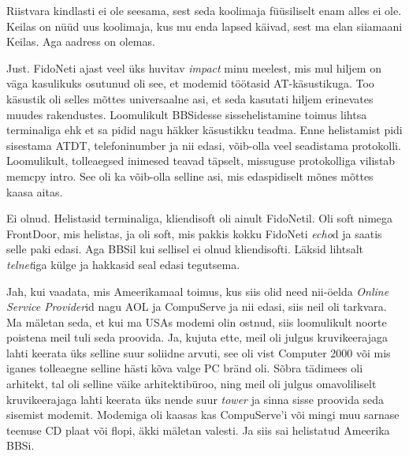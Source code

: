 
Riistvara kindlasti ei ole seesama, sest seda koolimaja füüsiliselt enam alles 
ei ole. Keilas on nüüd uus koolimaja, kus mu enda lapsed käivad, sest ma elan 
siiamaani Keilas. Aga aadress on olemas.


Just. FidoNeti ajast veel üks huvitav \emph{impact} minu meelest, mis mul  
hiljem on väga kasulikuks osutunud oli see, et modemid töötasid
AT-käsustikuga. 
Too käsustik oli selles mõttes universaalne asi, et seda kasutati hiljem 
erinevates muudes rakendustes. Loomulikult BBSidesse sissehelistamine toimus 
lihtsa terminaliga ehk et sa pidid nagu häkker käsustikku teadma. Enne 
helistamist pidi sisestama  ATDT, telefoninumber ja nii edasi, võib-olla veel 
seadistama protokolli. Loomulikult, tolleaegsed inimesed teavad täpselt, 
missuguse protokolliga vilistab  memcpy intro. See oli ka võib-olla selline 
asi, mis edaspidiselt  mõnes mõttes kaasa aitas.


Ei olnud. Helistasid terminaliga, kliendisoft oli ainult FidoNetil. Oli soft 
nimega FrontDoor, mis helistas, ja oli soft, mis pakkis kokku FidoNeti 
\emph{echo}d ja  saatis  selle paki edasi. Aga BBSil kui sellisel ei olnud 
kliendisofti. Läksid lihtsalt \emph{telnet}iga külge ja hakkasid seal edasi 
tegutsema.


Jah, kui vaadata, mis Ameerikamaal toimus, kus siis olid need nii-öelda 
\emph{Online Service Provider}id  nagu AOL ja 
CompuServe ja nii edasi, siis neil oli tarkvara. Ma mäletan seda, et 
kui ma USAs modemi  olin ostnud, siis loomulikult noorte poistena meil tuli 
seda proovida. Ja, kujuta ette, meil oli julgus kruvikeerajaga lahti keerata 
üks selline suur soliidne arvuti, see oli vist Computer 2000 või mis iganes 
tolleaegne  selline hästi kõva valge PC bränd oli. Sõbra tädimees oli 
arhitekt, tal oli selline väike arhitektibüroo, ning meil oli julgus  
omavoliliselt kruvikeerajaga  lahti keerata üks nende suur \emph{tower} ja 
sinna sisse proovida seda sisemist modemit. Modemiga oli kaasas kas 
CompuServe'i või mingi muu sarnase teenuse CD plaat või flopi, äkki mäletan 
valesti. Ja siis sai helistatud Ameerika BBSi.  

